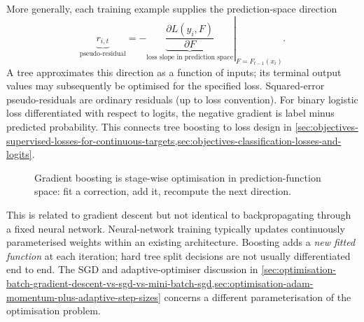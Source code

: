 More generally, each training example supplies the prediction-space direction
\begin{equation}
\boxed{
\underbrace{r_{i,t}}_{\text{pseudo-residual}}
=
-\left.\underbrace{\frac{\partial L(y_i,F)}{\partial F}}_{\text{loss slope in prediction space}}\right|_{F=F_{t-1}(x_i)}
}.
\end{equation}
A tree approximates this direction as a function of inputs; its terminal output values may subsequently be optimised for the specified loss.
Squared-error pseudo-residuals are ordinary residuals (up to loss convention).
For binary logistic loss differentiated with respect to logits, the negative gradient is label minus predicted probability.
This connects tree boosting to loss design in \cref{sec:objectives-supervised-losses-for-continuous-targets,sec:objectives-classification-losses-and-logits}.

\begin{figure}[htbp]\centering
{}
\caption{Gradient boosting is stage-wise optimisation in prediction-function space: fit a correction, add it, recompute the next direction.}
\label{fig:tree_boost_flow}
\end{figure}

This is related to gradient descent but not identical to backpropagating through a fixed neural network.
Neural-network training typically updates continuously parameterised weights within an existing architecture.
Boosting adds a \emph{new fitted function} at each iteration; hard tree split decisions are not usually differentiated end to end.
The SGD and adaptive-optimiser discussion in \cref{sec:optimisation-batch-gradient-descent-vs-sgd-vs-mini-batch-sgd,sec:optimisation-adam-momentum-plus-adaptive-step-sizes} concerns a different parameterisation of the optimisation problem.


